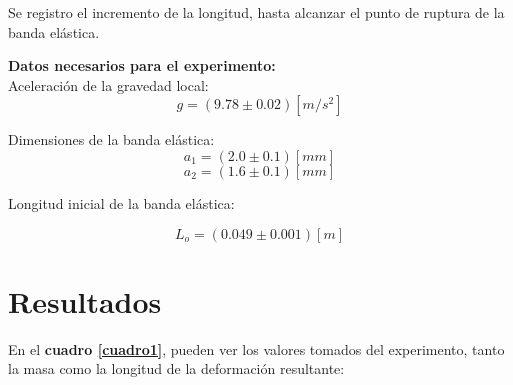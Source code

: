\documentclass[letter,11pt]{article}
\begin{document}
Se registro el incremento de la longitud, hasta alcanzar el punto de ruptura de
la banda elástica.

\vspace{0.35cm}
\textbf{Datos necesarios para el experimento:} \\

Aceleración de la gravedad local:
\begin{equation*}
    g = (9.78 \pm 0.02)[m/s^2]
\end{equation*}

Dimensiones de la banda elástica:
\begin{equation*}
    a_1 = (2.0 \pm 0.1)[mm]
\end{equation*}
\begin{equation*}
    a_2 = (1.6 \pm 0.1)[mm]
\end{equation*}

Longitud inicial de la banda elástica:

\begin{equation*}
    L_o = (0.049 \pm 0.001)[m]
\end{equation*}

\section{Resultados}

En el \textbf{cuadro \ref{cuadro1}}, pueden ver los valores tomados del 
experimento, tanto la masa como la longitud de la deformación resultante:
\end{document}

